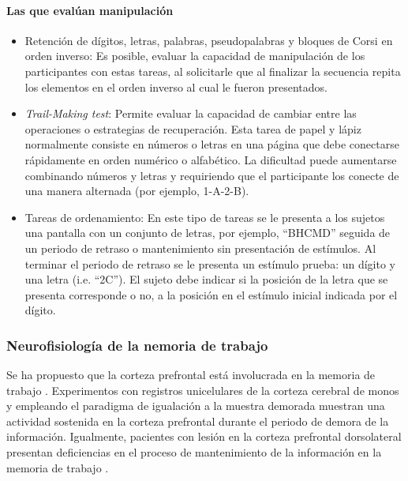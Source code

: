 \documentclass[12pt,letterpaper,final]{article}
\let\cite\cite %
\begin{document}
\paragraph*{Las que evalúan manipulación}
\begin{itemize}


	\item Retención de dígitos, letras, palabras, pseudopalabras y bloques de Corsi en orden inverso:
	Es posible, evaluar la capacidad de manipulación de los participantes con estas tareas, al solicitarle que al finalizar la secuencia repita los elementos en el orden inverso al cual le fueron presentados.

	\item \textit{Trail-Making test}:
	Permite evaluar la capacidad de cambiar entre las operaciones o estrategias de recuperación. Esta tarea de papel y lápiz normalmente consiste en números o letras en una página que debe conectarse rápidamente en orden numérico o alfabético. La dificultad puede aumentarse combinando números y letras y requiriendo que el participante los conecte de una manera alternada (por ejemplo, 1-A-2-B).

	\item Tareas de ordenamiento:
	En este tipo de tareas se le presenta a los sujetos una pantalla con un conjunto de letras, por ejemplo, “BHCMD” seguida de un periodo de retraso o mantenimiento sin presentación de estímulos. Al terminar el periodo de retraso se le presenta un estímulo prueba: un dígito y una letra (i.e. “2C”). El sujeto debe indicar si la posición de la letra que se presenta corresponde o no, a la posición en el estímulo inicial indicada por el dígito.

\end{itemize}


\subsubsection{Neurofisiología de la nemoria de trabajo}

Se ha propuesto que la corteza prefrontal está involucrada en la memoria de trabajo \cite{DEsposito1999,Liu2010}. Experimentos con registros unicelulares de la corteza cerebral de monos y empleando el paradigma de igualación a la muestra demorada \cite{Funahashi1989} muestran una actividad sostenida en la corteza prefrontal durante el periodo de demora de la información. Igualmente, pacientes con lesión en la corteza prefrontal dorsolateral presentan deficiencias en el proceso de mantenimiento de la información en la memoria de trabajo \cite{Eriksson2015}.
\end{document}
